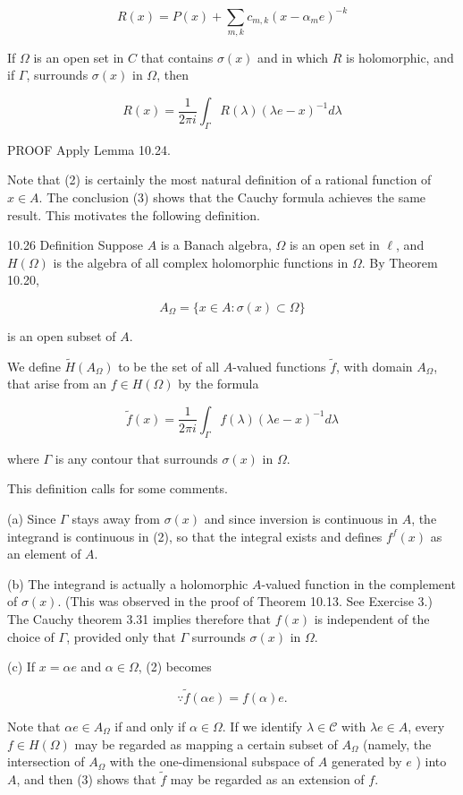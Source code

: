 \documentclass[10pt]{article}
\begin{document}
$$
R(x)=P(x)+\sum_{m, k} c_{m, k}\left(x-\alpha_{m} e\right)^{-k}
$$

If $\Omega$ is an open set in $C$ that contains $\sigma(x)$ and in which $R$ is holomorphic, and if $\Gamma$, surrounds $\sigma(x)$ in $\Omega$, then

$$
R(x)=\frac{1}{2 \pi i} \int_{\Gamma} R(\lambda)(\lambda e-x)^{-1} d \lambda
$$

PROOF Apply Lemma 10.24.

Note that (2) is certainly the most natural definition of a rational function of $x \in A$. The conclusion (3) shows that the Cauchy formula achieves the same result. This motivates the following definition.

10.26 Definition Suppose $A$ is a Banach algebra, $\Omega$ is an open set in $\ell$, and $H(\Omega)$ is the algebra of all complex holomorphic functions in $\Omega$. By Theorem 10.20,

$$
A_{\Omega}=\{x \in A: \sigma(x) \subset \Omega\}
$$

is an open subset of $A$.

We define $\tilde{H}\left(A_{\Omega}\right)$ to be the set of all $A$-valued functions $\tilde{f}$, with domain $A_{\Omega}$, that arise from an $f \in H(\Omega)$ by the formula

$$
\tilde{f}(x)=\frac{1}{2 \pi i} \int_{\Gamma} f(\lambda)(\lambda e-x)^{-1} d \lambda
$$

where $\Gamma$ is any contour that surrounds $\sigma(x)$ in $\Omega$.

This definition calls for some comments.

(a) Since $\Gamma$ stays away from $\sigma(x)$ and since inversion is continuous in $A$, the integrand is continuous in (2), so that the integral exists and defines $f^{f}(x)$ as an element of $A$.

(b) The integrand is actually a holomorphic $A$-valued function in the complement of $\sigma(x)$. (This was observed in the proof of Theorem 10.13. See Exercise 3.) The Cauchy theorem 3.31 implies therefore that $f(x)$ is independent of the choice of $\Gamma$, provided only that $\Gamma$ surrounds $\sigma(x)$ in $\Omega$.

(c) If $x=\alpha e$ and $\alpha \in \Omega$, (2) becomes

$$
\because \tilde{f}(\alpha e)=f(\alpha) e .
$$

Note that $\alpha e \in A_{\Omega}$ if and only if $\alpha \in \Omega$. If we identify $\lambda \in \mathscr{C}$ with $\lambda e \in A$, every $f \in H(\Omega)$ may be regarded as mapping a certain subset of $A_{\Omega}$ (namely, the intersection of $A_{\Omega}$ with the one-dimensional subspace of $A$ generated by $e$ ) into $A$, and then (3) shows that $\tilde{f}$ may be regarded as an extension of $f$.
\end{document}
